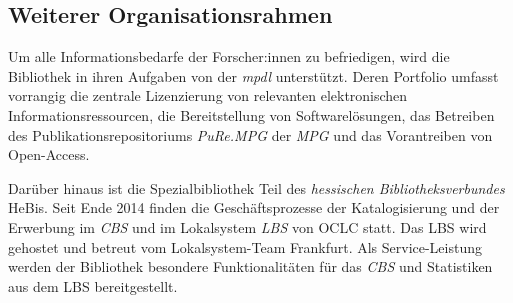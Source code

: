 \subsection{Weiterer Organisationsrahmen}
Um alle Informationsbedarfe der Forscher:innen zu befriedigen, wird die Bibliothek in ihren Aufgaben von der
\textit{\acrfull{mpdl}} unterstützt. Deren Portfolio umfasst vorrangig die zentrale 
Lizenzierung von relevanten elektronischen Informationsressourcen, die Bereitstellung von Softwarelösungen, 
das Betreiben des Publikationsrepositoriums \textit{\acrshort{PuRe.MPG}} der \textit{\acrfull{MPG}} und
das Vorantreiben von Open-Access. 

Darüber hinaus ist die Spezialbibliothek Teil des \textit{hessischen Bibliotheksverbundes} \acrshort{HeBis}. 
Seit Ende 2014 finden die Geschäftsprozesse der Katalogisierung und der Erwerbung im \textit{\acrfull{CBS}} und 
im Lokalsystem \textit{\acrfull{LBS}} von \acrshort{OCLC} statt. Das \acrshort{LBS} wird gehostet und betreut 
vom Lokalsystem-Team Frankfurt. Als Service-Leistung werden der Bibliothek besondere Funktionalitäten 
für das \textit{\acrlong{CBS}} und Statistiken aus dem \acrshort{LBS} bereitgestellt.


